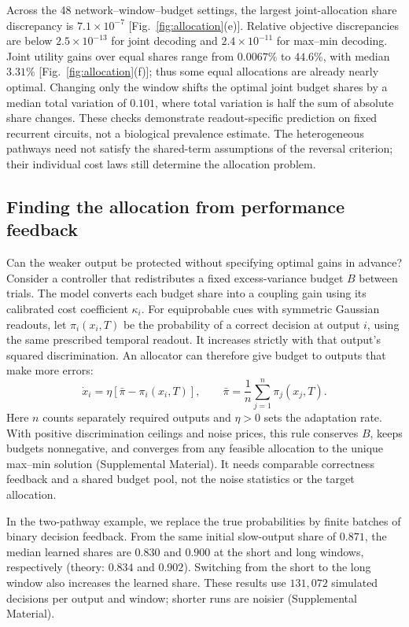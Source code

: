 \documentclass[aps,10pt,onecolumn,superscriptaddress,nofootinbib,longbibliography,
  amsmath,amssymb,floatfix]{revtex4-2}
\begin{document}
Across the 48 network--window--budget settings, the largest
joint-allocation share discrepancy is \(7.1\times10^{-7}\)
[Fig.~\ref{fig:allocation}(e)]. Relative objective discrepancies
are below \(2.5\times10^{-13}\) for joint decoding and
\(2.4\times10^{-11}\) for max--min decoding. Joint utility gains
over equal shares range from \(0.0067\%\) to \(44.6\%\), with
median \(3.31\%\) [Fig.~\ref{fig:allocation}(f)]; thus some equal
allocations are already nearly optimal. Changing only the window
shifts the optimal joint budget shares by a median total variation
of \(0.101\), where total variation is half the sum of absolute
share changes. These checks demonstrate readout-specific
prediction on fixed recurrent circuits, not a biological
prevalence estimate. The heterogeneous pathways need not satisfy
the shared-term assumptions of the reversal criterion; their
individual cost laws still determine the allocation problem.

\subsection{Finding the allocation from performance feedback}

Can the weaker output be protected without specifying optimal
gains in advance? Consider a controller that redistributes a fixed
excess-variance budget \(B\) between trials. The model converts
each budget share into a coupling gain using its calibrated cost
coefficient \(\kappa_i\).
For equiprobable cues with symmetric Gaussian readouts, let \(\pi_i(x_i,T)\) be
the probability of a correct decision at output \(i\), using the
same prescribed temporal readout. It increases strictly with that
output's squared discrimination. An allocator can therefore give
budget to outputs that make more errors:
\begin{equation}
  \dot x_i=\eta[\bar\pi-\pi_i(x_i,T)],\qquad
  \bar\pi=\frac{1}{n}\sum_{j=1}^{n}\pi_j(x_j,T).
  \label{eq:feedback}
\end{equation}
Here \(n\) counts separately required outputs and \(\eta>0\)
sets the adaptation rate. With positive discrimination ceilings
and noise prices, this rule conserves \(B\), keeps budgets nonnegative,
and converges from any feasible allocation to the unique max--min
solution (Supplemental Material).
It needs comparable correctness feedback and a shared budget
pool, not the noise statistics or the target allocation.

In the two-pathway example, we replace the true probabilities by
finite batches of binary decision feedback. From the same initial
slow-output share of \(0.871\), the median learned shares are
\(0.830\) and \(0.900\) at the short and long windows, respectively
(theory: \(0.834\) and \(0.902\)). Switching from the short to the
long window also increases the learned share. These results use
\(131{,}072\) simulated decisions per output and window; shorter
runs are noisier (Supplemental Material).
\end{document}
